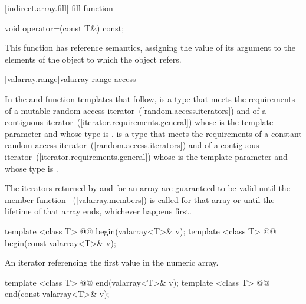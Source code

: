 [indirect.array.fill]{ fill function}

%
\begin{itemdecl}
void operator=(const T&) const;
\end{itemdecl}

\begin{itemdescr}
\pnum
This function has reference semantics, assigning the value of its argument
to the elements of the
object to which the
object refers.
\end{itemdescr}

[valarray.range]{valarray range access}

\pnum
In the  and  function templates that follow, 
is a type that meets the requirements of a mutable random access
iterator~(\ref{random.access.iterators})
and of a contiguous iterator~(\ref{iterator.requirements.general})
whose  is the template
parameter  and whose  type is .  is a
type that meets the requirements of a constant random access
iterator~(\ref{random.access.iterators})
and of a contiguous iterator~(\ref{iterator.requirements.general})
whose  is the template
parameter  and whose  type is .

\pnum
The iterators returned by  and  for an array
are guaranteed to be valid until the member function
~(\ref{valarray.members}) is called for that
array or until the lifetime of that array ends, whichever happens
first.

%
\begin{itemdecl}
template <class T> @@ begin(valarray<T>& v);
template <class T> @@ begin(const valarray<T>& v);
\end{itemdecl}

\begin{itemdescr}
\pnum
\returns An iterator referencing the first value in the numeric array.
\end{itemdescr}

%
\begin{itemdecl}
template <class T> @@ end(valarray<T>& v);
template <class T> @@ end(const valarray<T>& v);
\end{itemdecl}


